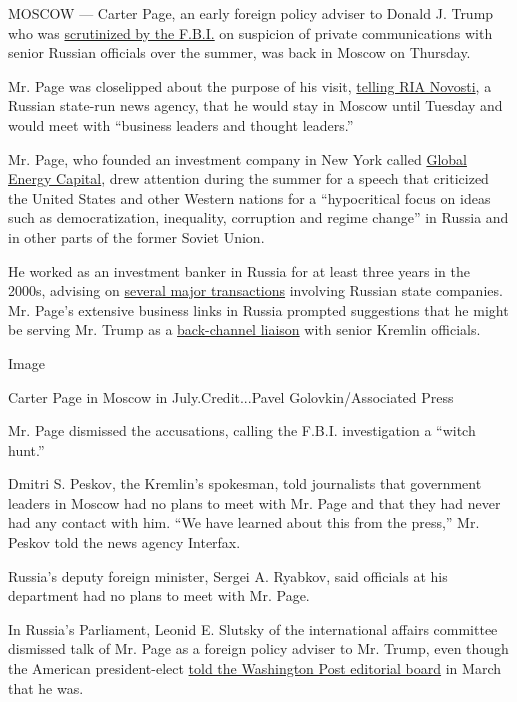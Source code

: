 MOSCOW --- Carter Page, an early foreign policy adviser to Donald J.
Trump who was
\href{http://www.nytimes.com/2016/11/01/us/politics/fbi-russia-election-donald-trump.html}{scrutinized
by the F.B.I.} on suspicion of private communications with senior
Russian officials over the summer, was back in Moscow on Thursday.

Mr. Page was closelipped about the purpose of his visit,
\href{https://sputniknews.com/russia/201612081048303433-trump-adviser-russia-talks/}{telling
RIA Novosti}, a Russian state-run news agency, that he would stay in
Moscow until Tuesday and would meet with ``business leaders and thought
leaders.''

Mr. Page, who founded an investment company in New York called
\href{http://globalenergycapital.com/}{Global Energy Capital}, drew
attention during the summer for a speech that criticized the United
States and other Western nations for a ``hypocritical focus on ideas
such as democratization, inequality, corruption and regime change'' in
Russia and in other parts of the former Soviet Union.

He worked as an investment banker in Russia for at least three years in
the 2000s, advising on
\href{http://globalenergycap.com/management/}{several major
transactions} involving Russian state companies. Mr. Page's extensive
business links in Russia prompted suggestions that he might be serving
Mr. Trump as a
\href{https://www.yahoo.com/news/u-s-intel-officials-probe-ties-between-trump-adviser-and-kremlin-175046002.html}{back-channel
liaison} with senior Kremlin officials.

Image

Carter Page in Moscow in July.Credit...Pavel Golovkin/Associated Press

Mr. Page dismissed the accusations, calling the F.B.I. investigation a
``witch hunt.''

Dmitri S. Peskov, the Kremlin's spokesman, told journalists that
government leaders in Moscow had no plans to meet with Mr. Page and that
they had never had any contact with him. ``We have learned about this
from the press,'' Mr. Peskov told the news agency Interfax.

Russia's deputy foreign minister, Sergei A. Ryabkov, said officials at
his department had no plans to meet with Mr. Page.

In Russia's Parliament, Leonid E. Slutsky of the international affairs
committee dismissed talk of Mr. Page as a foreign policy adviser to Mr.
Trump, even though the American president-elect
\href{https://www.washingtonpost.com/blogs/post-partisan/wp/2016/03/21/a-transcript-of-donald-trumps-meeting-with-the-washington-post-editorial-board/?utm_term=.e7c8cc4f1c13}{told
the Washington Post editorial board} in March that he was.

